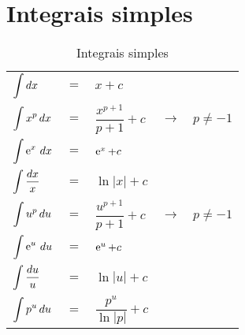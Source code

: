 \section{Integrais simples}
	\begin{table}[H]
		\caption{Integrais simples}
		\label{integrais_simples}
		\centering
		\begin{tabular}{|lclcr|}
			$\displaystyle\int dx$            & $=$ & $x + c$                       &               &  \\
			$\displaystyle\int x^p\, dx$      & $=$ & $\dfrac{x^{p + 1}}{p+ 1} + c$ & $\rightarrow$ & $p\neq -1$ \\
			$\displaystyle\int \operatorname{e}^x\, dx$     & $=$ & $\operatorname{e}^x + c$                    &               &  \\
			$\displaystyle\int \dfrac{dx}{x}$ & $=$ & $\ln|x| + c$                  &               &  \\
			$\displaystyle\int u^p\, du$      & $=$ & $\dfrac{u^{p + 1}}{p+ 1} + c$ & $\rightarrow$ & $p\neq -1$ \\
			$\displaystyle\int \operatorname{e}^u\, du$     & $=$ & $\operatorname{e}^u + c$                    &               &  \\
			$\displaystyle\int \dfrac{du}{u}$ & $=$ & $\ln|u| + c$                  &               &  \\
			$\displaystyle\int p^u\, du$      & $=$ & $\dfrac{p^u}{\ln|p|} + c$     &               &
		\end{tabular}		
	\end{table}

